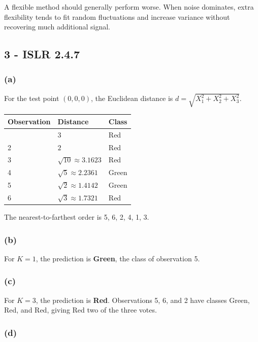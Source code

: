 \documentclass[11pt]{article}
\begin{document}
A flexible method should generally perform worse. When noise dominates,
extra flexibility tends to fit random fluctuations and increase variance
without recovering much additional signal.

    \hypertarget{islr-2.4.7}{%
\subsection{3 - ISLR 2.4.7}\label{islr-2.4.7}}

\hypertarget{a}{%
\subsubsection{(a)}\label{a}}

For the test point \((0,0,0)\), the Euclidean distance is
\(d=\sqrt{X_1^2+X_2^2+X_3^2}\).

\begin{longtable}[]{@{}lll@{}}
\toprule\noalign{}
Observation & Distance & Class \\
\midrule\noalign{}
\endhead
\bottomrule\noalign{}
\endlastfoot
1 & \(3\) & Red \\
2 & \(2\) & Red \\
3 & \(\sqrt{10}\approx3.1623\) & Red \\
4 & \(\sqrt{5}\approx2.2361\) & Green \\
5 & \(\sqrt{2}\approx1.4142\) & Green \\
6 & \(\sqrt{3}\approx1.7321\) & Red \\
\end{longtable}

The nearest-to-farthest order is 5, 6, 2, 4, 1, 3.

\hypertarget{b}{%
\subsubsection{(b)}\label{b}}

For \(K=1\), the prediction is \textbf{Green}, the class of observation
5.

\hypertarget{c}{%
\subsubsection{(c)}\label{c}}

For \(K=3\), the prediction is \textbf{Red}. Observations 5, 6, and 2
have classes Green, Red, and Red, giving Red two of the three votes.

\hypertarget{d}{%
\subsubsection{(d)}\label{d}}
\end{document}
